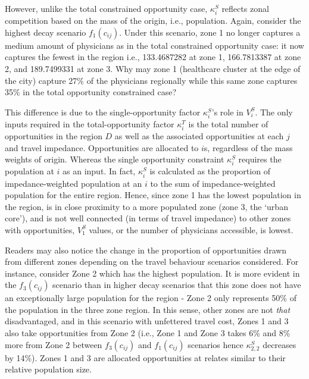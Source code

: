 \documentclass[
]{article}
\begin{document}
However, unlike the total constrained opportunity case, \(\kappa^S_{i}\)
reflects zonal competition based on the mass of the origin, i.e.,
population. Again, consider the highest decay scenario \(f_1(c_{ij})\).
Under this scenario, zone 1 no longer captures a medium amount of
physicians as in the total constrained opportunity case: it now captures
the fewest in the region i.e., 133.4687282 at zone 1, 166.7813387 at
zone 2, and 189.7499331 at zone 3. Why may zone 1 (healthcare cluster at
the edge of the city) capture 27\% of the physicians regionally while
this same zone captures 35\% in the total opportunity constrained case?

This difference is due to the single-opportunity factor
\(\kappa^S_{i}\)'s role in \(V_i^S\). The only inputs required in the
total-opportunity factor \(\kappa^T_i\) is the total number of
opportunities in the region \(D\) as well as the associated
opportunities at each \(j\) and travel impedance. Opportunities are
allocated to \(i\)s, regardless of the mass weights of origin. Whereas
the single opportunity constraint \(\kappa^S_{i}\) requires the
population at \(i\) as an input. In fact, \(\kappa^S_{i}\) is calculated
as the proportion of impedance-weighted population at an \(i\) to the
sum of impedance-weighted population for the entire region. Hence, since
zone 1 has the lowest population in the region, is in close proximity to
a more populated zone (zone 3, the `urban core'), and is not well
connected (in terms of travel impedance) to other zones with
opportunities, \(V_{1}^S\) values, or the number of physicians
accessible, is lowest.

Readers may also notice the change in the proportion of opportunities
drawn from different zones depending on the travel behaviour scenarios
considered. For instance, consider Zone 2 which has the highest
population. It is more evident in the \(f_3(c_{ij})\) scenario than in
higher decay scenarios that this zone does not have an exceptionally
large population for the region - Zone 2 only represents 50\% of the
population in the three zone region. In this sense, other zones are not
\emph{that} disadvantaged, and in this scenario with unfettered travel
cost, Zones 1 and 3 also take opportunities from Zone 2 (i.e., Zone 1
and Zone 3 takes 6\% and 8\% more from Zone 2 between \(f_3(c_{ij})\)
and \(f_1(c_{ij})\) scenarios hence \(\kappa_{2,2}^S\) decreases by
14\%). Zones 1 and 3 are allocated opportunities at relates similar to
their relative population size.
\end{document}
